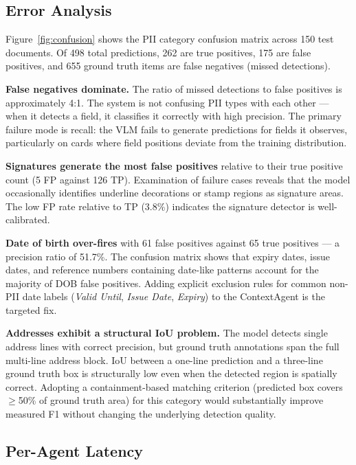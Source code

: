 \documentclass[conference]{IEEEtran}
\begin{document}
\subsection{Error Analysis}

Figure~\ref{fig:confusion} shows the PII category
confusion matrix across 150 test documents.
Of 498 total predictions, 262 are true positives,
175 are false positives, and 655 ground truth
items are false negatives (missed detections).

\textbf{False negatives dominate.}
The ratio of missed detections to false positives
is approximately 4:1.
The system is not confusing PII types with each
other --- when it detects a field, it classifies
it correctly with high precision.
The primary failure mode is recall: the VLM fails
to generate predictions for fields it observes,
particularly on cards where field positions deviate
from the training distribution.

\textbf{Signatures generate the most false positives}
relative to their true positive count
(5 FP against 126 TP).
Examination of failure cases reveals that the
model occasionally identifies underline decorations
or stamp regions as signature areas.
The low FP rate relative to TP (3.8\%) indicates
the signature detector is well-calibrated.

\textbf{Date of birth over-fires} with 61 false
positives against 65 true positives ---
a precision ratio of 51.7\%.
The confusion matrix shows that expiry dates,
issue dates, and reference numbers containing
date-like patterns account for the majority of DOB
false positives.
Adding explicit exclusion rules for common
non-PII date labels (\textit{Valid Until},
\textit{Issue Date}, \textit{Expiry}) to the
ContextAgent is the targeted fix.

\textbf{Addresses exhibit a structural IoU problem.}
The model detects single address lines with correct
precision, but ground truth annotations span the
full multi-line address block.
IoU between a one-line prediction and a three-line
ground truth box is structurally low even when the
detected region is spatially correct.
Adopting a containment-based matching criterion
(predicted box covers $\geq$50\% of ground truth
area) for this category would substantially improve
measured F1 without changing the underlying
detection quality.

\subsection{Per-Agent Latency}
\end{document}

